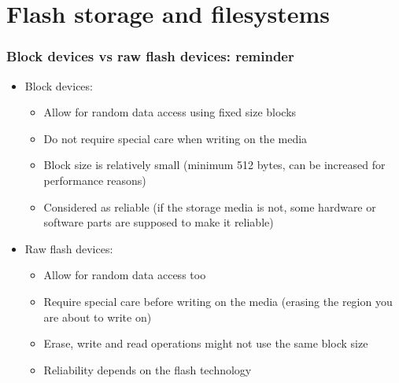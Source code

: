 \section{Flash storage and filesystems}

\begin{frame}
  \frametitle{Block devices vs raw flash devices: reminder}
  \begin{itemize}
  \item Block devices:
    \begin{itemize}
    \item Allow for random data access using fixed size blocks
    \item Do not require special care when writing on the media
    \item Block size is relatively small (minimum 512 bytes, can be
      increased for performance reasons)
    \item Considered as reliable (if the storage media is not, some
      hardware or software parts are supposed to make it reliable)
    \end{itemize}
  \item Raw flash devices:
    \begin{itemize}
    \item Allow for random data access too
    \item Require special care before writing on the media (erasing
      the region you are about to write on)
    \item Erase, write and read operations might not use the same block
      size
    \item Reliability depends on the flash technology
    \end{itemize}
  \end{itemize}
\end{frame}

